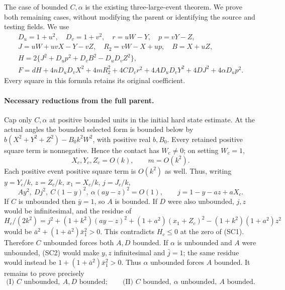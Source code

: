 The case of bounded $C,\alpha$ is the existing three-large-event
theorem. We prove both remaining cases, without modifying the parent
or identifying the source and testing fields. We use
\[
\begin{gathered}
 D_u=1+u^2,\quad D_v=1+v^2,\quad r=uW-Y,\quad p=vY-Z,\\
 J=uW+uvX-Y-vZ,\quad R_2=vW-X+up,\quad B=X+uZ,\\
 H=2\{J^2+D_up^2+D_vB^2-D_uD_vZ^2\},\\
 F=dH+4nD_uD_vX^2+4mR_2^2+4CD_vr^2
       +4AD_uD_vY^2+4DJ^2+4\alpha D_up^2.              
\end{gathered}
\tag{SC1}
\]
Every square in this formula retains its original coefficient.

\paragraph{Necessary reductions from the full parent.}
Cap only $C,\alpha$ at positive bounded units in the initial hard
state estimate. At the actual angles the bounded selected form is
bounded below by
$b(X^2+Y^2+Z^2)-B_0k^2W^2$, with positive real $b,B_0$.
Every retained positive square term is nonnegative. Hence the contact has $W_c\ne0$;
on setting $W_c=1$,
\[
 X_c,Y_c,Z_c=O(k),\qquad m=O(k^2).
\]
Each positive event positive square term is $O(k^2)$ as well. Thus, writing
$y=Y_c/k$, $z=Z_c/k$, $x_1=X_c/k$, $j=J_c/k$,
\[
 Ay^2,\ Dj^2,\ C(1-y)^2,\ \alpha(ay-z)^2=O(1),\qquad
 j=1-y-az+aX_c.                                      \tag{SC2}
\]
If $C$ is unbounded then $\bar y=1$, so $A$ is bounded. If $D$
were also unbounded, $j,z$ would be infinitesimal, and the residue of
\[
 H_c/(2k^2)=j^2+(1+k^2)(ay-z)^2
            +(1+a^2)(x_1+Z_c)^2-(1+k^2)(1+a^2)z^2
\]
would be $\bar a^2+(1+\bar a^2)\bar x_1^2>0$.
This contradicts $H_c\leq0$ at the zero of (SC1). Therefore
$C$ unbounded forces both $A,D$ bounded. If $\alpha$ is unbounded
and $A$ were unbounded, (SC2) would make $y,z$ infinitesimal and
$\bar j=1$; the same residue would instead be
$1+(1+\bar a^2)\bar x_1^2>0$. Thus $\alpha$ unbounded forces $A$
bounded. It remains to prove precisely
\[
 \text{(I) } C\text{ unbounded},\ A,D\text{ bounded};\qquad
 \text{(II) } C\text{ bounded},\ \alpha\text{ unbounded},\ A\text{ bounded}.
                                                               \tag{SC3}
\]

